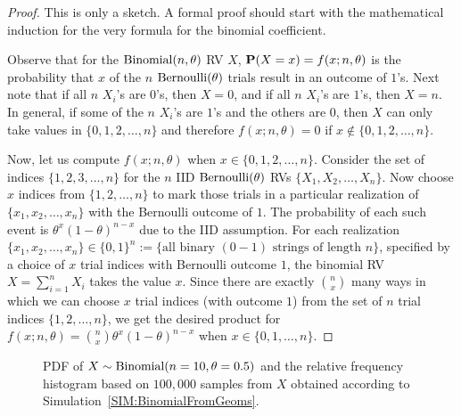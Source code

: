 {\scriptsize
\begin{proof} This is only a sketch. A formal proof should start with the mathematical induction for the very formula for the binomial coefficient.

Observe that for the $\mbox{{\rm Binomial}}(n,\theta)$ RV $X$, $\mathbf{P}(X=x) = f(x;n,\theta)$ is the probability that $x$ of the $n$ $\mbox{{\rm Bernoulli}}(\theta)$ trials result in an outcome of $1$'s.  Next note that if all $n$ $X_i$'s are $0$'s, then $X=0$, and if all $n$ $X_i$'s are $1$'s, then $X=n$.  In general, if some of the $n$ $X_i$'s are $1$'s and the others are $0$, then $X$ can only take values in $\{0,1,2,\ldots,n\}$ and therefore $f(x;n,\theta)=0$ if $x \notin \{0,1,2,\ldots,n\}$.

Now, let us compute $f(x;n,\theta)$ when $x\in\{0,1,2,\ldots,n\}$.  Consider the set of indices $\{1,2,3,\ldots,n\}$ for the $n$ IID $\mbox{{\rm Bernoulli}}(\theta)$ RVs $\{X_1,X_2,\ldots,X_n\}$.  Now choose $x$ indices from $\{1,2,\ldots,n\}$ to mark those trials in a particular realization of $\{x_1,x_2,\ldots,x_n\}$ with the Bernoulli outcome of $1$.  The probability of each such event is $\theta^x (1-\theta)^{n-x}$ due to the IID assumption.  For each realization $\{x_1,x_2,\ldots,x_n\} \in \{0,1\}^{n} := \{ \text{all binary $(0-1)$ strings of length $n$}\}$, specified by a choice of $x$ trial indices with Bernoulli outcome $1$, the binomial RV $X=\sum_{i=1}^n X_i$ takes the value $x$.  Since there are exactly $\binom{n}{x}$ many ways in which we can choose $x$ trial indices (with outcome $1$) from the set of $n$ trial indices $\{1,2,\ldots,n\}$, we get the desired product for $f(x; n,\theta) = \binom{n}{x} \theta^x (1-\theta)^{n-x}$ when $x \in \{0,1,\ldots,n\}$.
\end{proof}
}
\begin{figure}[htpb]
\caption{PDF of $X \sim \mbox{{\rm Binomial}}(n=10,\theta=0.5)$ and the relative frequency histogram based on $100,000$ samples from $X$ obtained according to Simulation~\ref{SIM:BinomialFromGeoms}.\label{F:PlotPdfSim10000HistBinomByGeomsn10thetaHalf}} %
\centering   {}
\end{figure}

